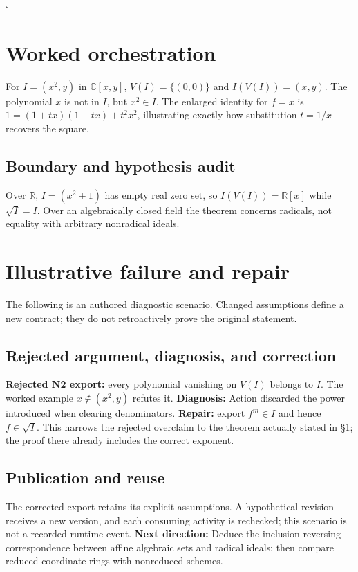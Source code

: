 \documentclass[preprint,12pt,aps,pra,showkeys,amsmath,amssymb,superscriptaddress,floatfix]{revtex4-2}
\theoremstyle{definition}
\theoremstyle{remark}
\begin{document}
\hfill$\square$

\section{Worked orchestration}

For \(I=(x^2,y)\) in \(\mathbb C[x,y]\), \(V(I)=\{(0,0)\}\) and
\(I(V(I))=(x,y)\). The polynomial \(x\) is not in \(I\), but
\(x^2\in I\). The enlarged identity for \(f=x\) is
\(1=(1+tx)(1-tx)+t^2x^2\), illustrating exactly how substitution
\(t=1/x\) recovers the square.

\subsection{Boundary and hypothesis audit}

Over \(\mathbb R\), \(I=(x^2+1)\) has empty real zero set, so
\(I(V(I))=\mathbb R[x]\) while \(\sqrt I=I\). Over an algebraically
closed field the theorem concerns radicals, not equality with arbitrary
nonradical ideals.

\section{Illustrative failure and repair}

The following is an authored diagnostic scenario. Changed assumptions
define a new contract; they do not retroactively prove the original
statement.

\subsection{Rejected argument, diagnosis, and correction}
\textbf{Rejected N2 export:} every polynomial vanishing on \(V(I)\)
belongs to \(I\). The worked example \(x\notin(x^2,y)\) refutes it.
\textbf{Diagnosis:} Action discarded the power introduced when clearing
denominators. \textbf{Repair:} export \(f^m\in I\) and hence
\(f\in\sqrt I\). This narrows the rejected overclaim to the theorem
actually stated in §1; the proof there already includes the correct
exponent.

\subsection{Publication and reuse}
The corrected export retains its explicit assumptions. A hypothetical
revision receives a new version, and each consuming activity is
rechecked; this scenario is not a recorded runtime event. \textbf{Next
direction:} Deduce the inclusion-reversing correspondence between affine
algebraic sets and radical ideals; then compare reduced coordinate rings
with nonreduced schemes.
\end{document}
